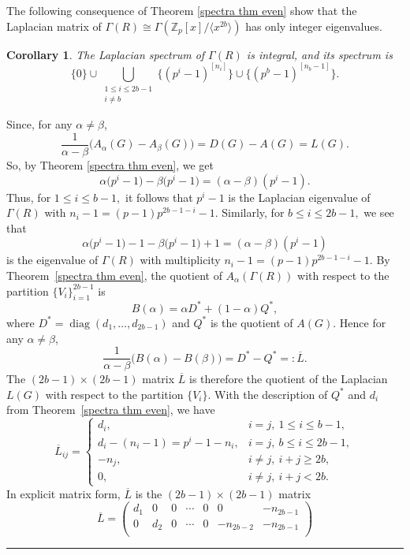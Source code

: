 \documentclass[12pt,twoside]{article}
\renewenvironment{proof}{{\noindent\bfseries Proof.}}{\qed}
\newtheorem{corollary}[theorem]{Corollary}
\def\qed{\nolinebreak\hfill\rule{.2cm}{.2cm}\par\addvspace{.5cm}}
\begin{document}
The following consequence of Theorem \ref{spectra thm even} show that the Laplacian matrix of $ \varGamma(R)\cong  \varGamma(\mathbb{Z}_p[x]/\langle x^{2b}\rangle)$ has only integer eigenvalues.
\begin{corollary}\label{L integral even}
	The Laplacian spectrum of $ \varGamma(R)$ is integral, and its spectrum is 
	\[ \{0\}
	\cup
	\bigcup_{\substack{1\le i\le 2b-1\\ i\neq b}}
	\bigl\{(p^{ i}-1)^{[n_i]}\bigr\}
	\cup
	\bigl\{(p^{ b}-1)^{[n_b-1]}\bigr\}. \]
\end{corollary}
\begin{proof}
	Since, for any $\alpha\neq\beta$,
	\[
	\frac{1}{\alpha-\beta}\bigl(A_\alpha(G)-A_\beta(G)\bigr)
	= D(G)-A(G)=L(G).
	\]
	So, by Theorem \ref{spectra thm even}, we get $$\alpha\bigl(p^{ i}-1\bigr)-\beta\bigl(p^{i}-1\bigr)=(\alpha-\beta)(p^{i}-1).$$
	Thus, for $1\le i \le b-1,$ it follows that $p^{i}-1$  is the Laplacian eigenvalue of $ \varGamma(R)$ with $n_i - 1 = (p-1)p^{ 2b-1-i} - 1$. Similarly, for $b\le i \le 2b-1,$ we see that 
	$$\alpha\bigl(p^{ i}-1\bigr) - 1-\beta\bigl(p^{ i}-1\bigr) + 1=(\alpha-\beta)(p^{i}-1) $$ is the eigenvalue of $ \varGamma(R)$ with multiplicity $n_i - 1 = (p-1)p^{ 2b-1-i} - 1$.  By Theorem~\ref{spectra thm even}, the quotient of $A_\alpha( \varGamma(R))$ 
	with respect to the partition $\{V_i\}_{i=1}^{2b-1}$ is
	\[
	B(\alpha) = \alpha D^\ast + (1-\alpha)Q^\ast,
	\]
	where $D^\ast=\operatorname{diag}(d_1,\dots,d_{2b-1})$ and $Q^\ast$ is the quotient of $A(G)$. Hence for any $\alpha\neq\beta$,
	\[
	\frac{1}{\alpha-\beta}\bigl(B(\alpha)-B(\beta)\bigr)
	= D^\ast - Q^\ast =: \overline{L}.
	\]
	The $(2b-1)\times(2b-1)$ matrix $\overline{L}$ is therefore the quotient of the Laplacian $L(G)$ with respect to
	the partition $\{V_i\}$. With the description of $Q^\ast$ and $d_i$ from Theorem~\ref{spectra thm even}, we have
	\[
	\overline{L}_{ij} =
	\begin{cases}
		d_i, & i=j,\ 1\le i\le b-1,\\
		d_i-(n_i-1)=p^{ i}-1-n_i, & i=j,\ b\le i\le 2b-1,\\
		- n_j, & i\ne j,\ i+j\ge 2b,\\
		0, & i\ne j,\ i+j<2b.
	\end{cases}
	\]
In explicit matrix form, $\overline{L}$ is the $(2b-1)\times(2b-1)$ matrix
\[
\overline{L}=
\begin{pmatrix}
	d_1 & 0   & 0   & \cdots & 0         & 0         & -n_{2b-1} \\[3pt]
	0   & d_2 & 0   & \cdots & 0         & -n_{2b-2} & -n_{2b-1} \\[3pt]

\end{pmatrix}\]
\end{proof}
\end{document}
